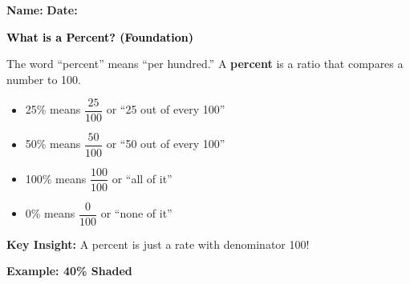 \documentclass[12pt, letterpaper, fleqn]{article}
\begin{document}
\textbf{Name:} \underline{\hspace{5cm}}
\hfill
\textbf{Date:} \underline{\hspace{3cm}}\\

\begin{tcolorbox}[colback=customteal!20]
    \large\textcolor{black}{\textbf{What is a Percent? (Foundation)}}
\end{tcolorbox}

\vspace{3mm}

\noindent
The word ``percent'' means ``per hundred.'' A \textbf{percent} is a ratio that compares a number to 100.

\vspace{0.5cm}

\begin{itemize}
    \item 25\% means $\dfrac{25}{100}$ or ``25 out of every 100''
    \item 50\% means $\dfrac{50}{100}$ or ``50 out of every 100''
    \item 100\% means $\dfrac{100}{100}$ or ``all of it''
    \item 0\% means $\dfrac{0}{100}$ or ``none of it''
\end{itemize}


\vspace{1.5cm}

\noindent
\textbf{Key Insight:} A percent is just a rate with denominator 100!

\vspace{1.5cm}
\begin{tcolorbox}[colback=white, colframe=black!25, boxrule=0.6pt, arc=4mm, left=6mm, right=6mm, top=5mm, bottom=5mm]


\textbf{Example: 40\% Shaded}
\vspace{1cm}
\begin{center}
\end{center}
\vspace{1cm}
\end{tcolorbox}
\end{document}
